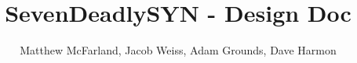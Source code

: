 \documentclass[12pt]{article}
\begin{document}
		
\title{SevenDeadlySYN - Design Doc}
\author{Matthew McFarland, Jacob Weiss, Adam Grounds, Dave Harmon}
\date{}
\maketitle
   	
\tableofcontents

\pagebreak




\end{document}
